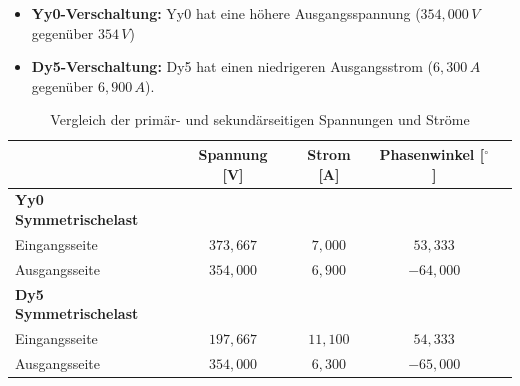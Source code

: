 \begin{enumerate}[label=\alph*)]
	      \begin{itemize}
		      \item \textbf{Yy0-Verschaltung:} Yy0 hat eine höhere Ausgangsspannung (\(354,000 \, V\) gegenüber \(354 \, V\))
		      \item \textbf{Dy5-Verschaltung:} Dy5 hat einen niedrigeren Ausgangsstrom (\(6,300 \, A\) gegenüber \(6,900 \, A\)).

	      \end{itemize}

	      \begin{table}[h!]
		      \caption{Vergleich der primär- und sekundärseitigen Spannungen und Ströme}
		      \centering
		      \begin{tabular}{lcccc}
			      \hline
			                                    & \textbf{Spannung [V]} & \textbf{Strom [A]} & \textbf{Phasenwinkel [$^\circ$]} \\
			      \hline
			      \textbf{Yy0 Symmetrischelast} &                       &                    &                                  \\
			      Eingangsseite                 & $373,667$             & $7,000$            & $53,333$                         \\
			      Ausgangsseite                 & $354,000$             & $6,900$            & $-64,000$                        \\
			      \hline
			      \textbf{Dy5 Symmetrischelast} &                       &                    &                                  \\
			      Eingangsseite                 & $197,667$             & $11,100$           & $54,333$                         \\
			      Ausgangsseite                 & $354,000$             & $6,300$            & $-65,000$                        \\
			      \hline
		      \end{tabular}
	      \end{table}

\end{enumerate}

